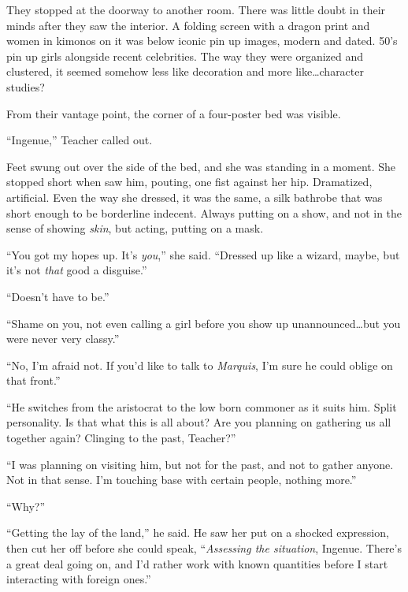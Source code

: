 They stopped at the doorway to another room.  There was little doubt in their minds after they saw the interior.  A folding screen with a dragon print and women in kimonos on it was below iconic pin up images, modern and dated.  50's pin up girls alongside recent celebrities. The way they were organized and clustered, it seemed somehow less like decoration and more like\ldots character studies?



From their vantage point, the corner of a four-poster bed was visible.



``Ingenue,'' Teacher called out.



Feet swung out over the side of the bed, and she was standing in a moment.  She stopped short when saw him, pouting, one fist against her hip.  Dramatized, artificial.  Even the way she dressed, it was the same, a silk bathrobe that was short enough to be borderline indecent.  Always putting on a show, and not in the sense of showing \emph{skin}, but acting, putting on a mask.



``You got my hopes up.  It's \emph{you},'' she said.  ``Dressed up like a wizard, maybe, but it's not \emph{that} good a disguise.''



``Doesn't have to be.''



``Shame on you, not even calling a girl before you show up unannounced\ldots but you were never very classy.''



``No, I'm afraid not.  If you'd like to talk to \emph{Marquis}, I'm sure he could oblige on that front.''



``He switches from the aristocrat to the low born commoner as it suits him.  Split personality.  Is that what this is all about?  Are you planning on gathering us all together again?  Clinging to the past, Teacher?''



``I was planning on visiting him, but not for the past, and not to gather anyone.  Not in that sense.  I'm touching base with certain people, nothing more.''



``Why?''



``Getting the lay of the land,'' he said.  He saw her put on a shocked expression, then cut her off before she could speak, ``\emph{Assessing the situation}, Ingenue.  There's a great deal going on, and I'd rather work with known quantities before I start interacting with foreign ones.''




